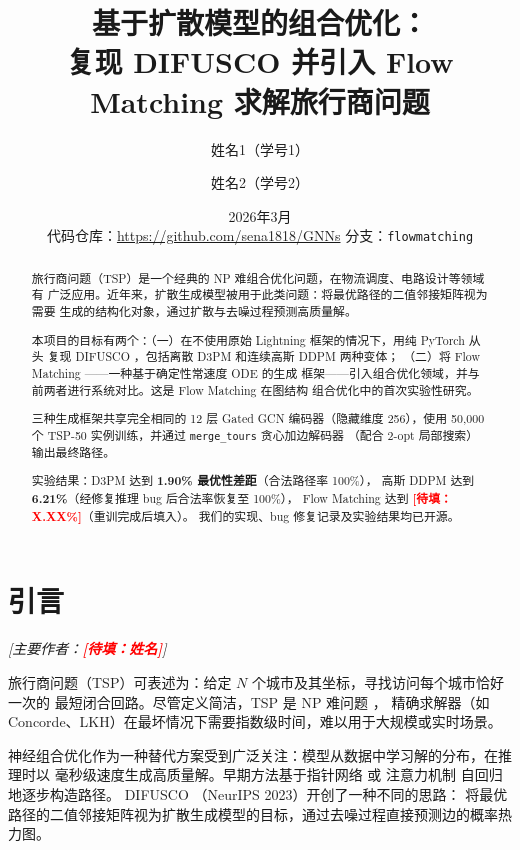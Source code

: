 \documentclass[11pt,a4paper]{article}
\title{\textbf{基于扩散模型的组合优化：}\\
       \textbf{复现 DIFUSCO 并引入 Flow Matching 求解旅行商问题}}
\author{
  姓名1（学号1）
  \and
  姓名2（学号2）
}
\date{2026年3月 \\[0.5em]
  \small 代码仓库：\url{https://github.com/sena1818/GNNs} \quad 分支：\texttt{flowmatching}
}
\newcommand{\TODO}[1]{\textcolor{red}{\textbf{[待填：#1]}}}
\begin{document}
\maketitle

\begin{abstract}
%

旅行商问题（TSP）是一个经典的 NP 难组合优化问题，在物流调度、电路设计等领域有
广泛应用。近年来，扩散生成模型被用于此类问题：将最优路径的二值邻接矩阵视为需要
生成的结构化对象，通过扩散与去噪过程预测高质量解。

本项目的目标有两个：（一）在不使用原始 Lightning 框架的情况下，用纯 PyTorch 从头
复现 DIFUSCO \citep{sun2023difusco}，包括离散 D3PM 和连续高斯 DDPM 两种变体；
（二）将 Flow Matching \citep{lipman2022flow}——一种基于确定性常速度 ODE 的生成
框架——引入组合优化领域，并与前两者进行系统对比。这是 Flow Matching 在图结构
组合优化中的首次实验性研究。

三种生成框架共享完全相同的 12 层 Gated GCN 编码器（隐藏维度 256），使用
50{,}000 个 TSP-50 实例训练，并通过 \texttt{merge\_tours} 贪心加边解码器
（配合 2-opt 局部搜索）输出最终路径。

实验结果：D3PM 达到 \textbf{1.90\% 最优性差距}（合法路径率 100\%），
高斯 DDPM 达到 \textbf{6.21\%}（经修复推理 bug 后合法率恢复至 100\%），
Flow Matching 达到 \TODO{X.XX\%}（重训完成后填入）。
我们的实现、bug 修复记录及实验结果均已开源。
\end{abstract}


\section{引言}
\label{sec:intro}
\textit{[主要作者：\TODO{姓名}]}

旅行商问题（TSP）可表述为：给定 $N$ 个城市及其坐标，寻找访问每个城市恰好一次的
最短闭合回路。尽管定义简洁，TSP 是 NP 难问题 \citep{garey1979computers}，
精确求解器（如 Concorde、LKH）在最坏情况下需要指数级时间，难以用于大规模或实时场景。

神经组合优化作为一种替代方案受到广泛关注：模型从数据中学习解的分布，在推理时以
毫秒级速度生成高质量解。早期方法基于指针网络 \citep{vinyals2015pointer} 或
注意力机制 \citep{kool2019attention} 自回归地逐步构造路径。
DIFUSCO \citep{sun2023difusco}（NeurIPS 2023）开创了一种不同的思路：
将最优路径的二值邻接矩阵视为扩散生成模型的目标，通过去噪过程直接预测边的概率热力图。
\end{document}

